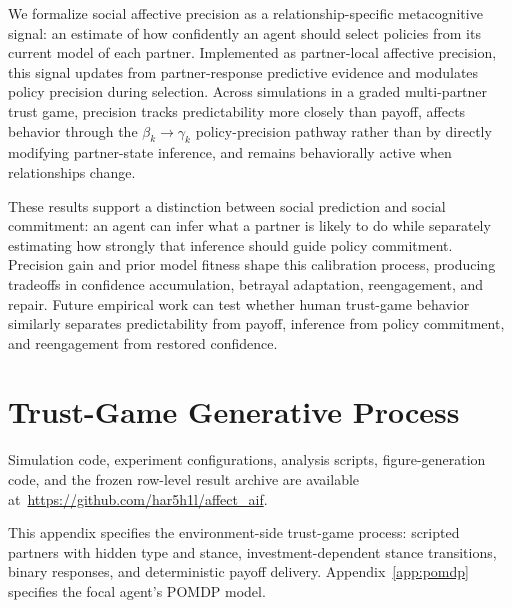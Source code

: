\documentclass[runningheads,orivec]{llncs}
\newcommand{\githubrepourl}{\url{https://github.com/har5h1l/affect_aif}}
\newcommand{\appendixsupplementarystatement}{%
  Simulation code, experiment configurations, analysis scripts, figure-generation code, and the frozen row-level result archive are available at~\githubrepourl.
}
\begin{document}
We formalize social affective precision as a relationship-specific metacognitive signal: an estimate of how confidently an agent should select policies from its current model of each partner. Implemented as partner-local affective precision, this signal updates from partner-response predictive evidence and modulates policy precision during selection. Across simulations in a graded multi-partner trust game, precision tracks predictability more closely than payoff, affects behavior through the $\beta_k \rightarrow \gamma_k$ policy-precision pathway rather than by directly modifying partner-state inference, and remains behaviorally active when relationships change.

These results support a distinction between social prediction and social commitment: an agent can infer what a partner is likely to do while separately estimating how strongly that inference should guide policy commitment. Precision gain and prior model fitness shape this calibration process, producing tradeoffs in confidence accumulation, betrayal adaptation, reengagement, and repair. Future empirical work can test whether human trust-game behavior similarly separates predictability from payoff, inference from policy commitment, and reengagement from restored confidence.




\clearpage
\appendix
\renewcommand{\thesection}{\arabic{section}}
\makeatletter
\newcommand{\appendixprefix@section}{Appendix~}
\renewcommand{\@seccntformat}[1]{\csname appendixprefix@#1\endcsname\csname the#1\endcsname\quad}
\makeatother
\renewcommand{\theHsection}{appendix.\arabic{section}}
\raggedbottom
\section{Trust-Game Generative Process}
\label{app:generative_process}
\label{app:supplementary}

\appendixsupplementarystatement

This appendix specifies the environment-side trust-game process: scripted partners with hidden type and stance, investment-dependent stance transitions, binary responses, and deterministic payoff delivery. Appendix~\ref{app:pomdp} specifies the focal agent's POMDP model.
\end{document}
